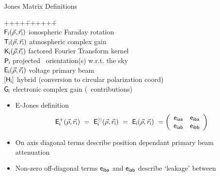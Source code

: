 \documentclass[pdf,azure,slideColor,colorBG]{prosper}
\begin{document}
\begin{slide}{Jones Matrix Definitions}
\vspace{-0.5cm}	
\begin{small}
\begin{tabbing}
++++\=++++++\= \kill   %
\+					%
~\\ ${\sf F}_{{\sf i}}({\vec{\rho}},{\vec{r}}_{{\sf i}})$   \> ionospheric Faraday rotation 
~\\ ${\sf T}_{{\sf i}}({\vec{\rho}},{\vec{r}}_{{\sf i}})$   \> atmospheric complex gain
~\\ ${\sf K}_{{\sf i}}({\vec{\rho}}.{\vec{r}}_{{\sf i}})$   \> factored Fourier Transform kernel 
~\\ ${\sf P}_{{\sf i}}$     \> projected \Receptor\ orientation(s) w.r.t. the sky
~\\ ${\sf E}_{{\sf i}}({\vec{\rho}},{\vec{r}}_{{\sf i}})$     \> voltage primary beam
~\\ $[{\sf H}_{{\sf i}}]$     \> hybrid (conversion to circular polarization
                         coord)
~\\ ${\sf G}_{{\sf i}}$     \> electronic complex gain (\Station\ contributions)
\end{tabbing}


\begin{itemize}
\item E-Jones definition
\begin{displaymath}
 {\sf E}^{+}_{{\sf i}}({\vec{\rho}},{\vec{r}}_{{\sf i}})
  ~=
  ~{\sf E}^{\odot}_{{\sf i}}({\vec{\rho}},{\vec{r}}_{{\sf i}})
  ~=
  ~{\sf E}_{{\sf i}}({\vec{\rho}},{\vec{r}}_{{\sf i}})
  ~=
  \left(\begin{array}{cc}{\sf e}_{{\sf i}{\sf a}{\sf a}} & {\sf e}_{{\sf i}{\sf b}{\sf a}}\\ {\sf e}_{{\sf i}{\sf a}{\sf b}} & {\sf e}_{{\sf i}{\sf b}{\sf b}} \end{array}\right)
\end{displaymath}
\item On axis diagonal terms describe position dependant primary beam attenuation
\item Non-zero off-diagonal terms ${\sf e}_{{\sf i}{\sf b}{\sf a}}$ and ${\sf e}_{{\sf i}{\sf a}{\sf b}}$ describe `leakage' between \Receptors
\end{itemize}
\end{small}
\end{slide}                             
\end{document}
